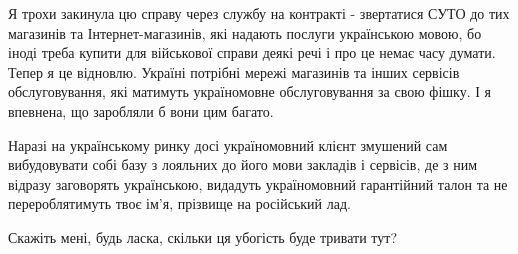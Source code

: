 Я трохи закинула цю справу через службу на контракті - звертатися СУТО до тих
магазинів та Інтернет-магазинів, які надають послуги українською мовою, бо
іноді треба купити для військової справи деякі речі і про це немає часу думати.
Тепер я це відновлю. Україні потрібні мережі магазинів та інших сервісів
обслуговування, які матимуть україномовне обслуговування за свою фішку. І я
впевнена, що заробляли б вони цим багато.

Наразі на українському ринку досі україномовний клієнт змушений сам
вибудовувати собі базу з лояльних до його мови закладів і сервісів, де з ним
відразу заговорять українською, видадуть україномовний гарантійний талон та не
перероблятимуть твоє ім’я, прізвище  на російський лад.

Скажіть мені, будь ласка, скільки ця убогість буде тривати тут?


